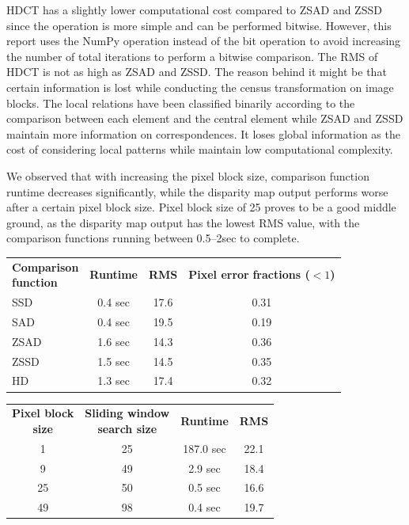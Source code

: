 \documentclass[conference]{IEEEtran}
\begin{document}
HDCT has a slightly lower computational cost compared to ZSAD and ZSSD since the operation is more simple and can be performed bitwise. However, this report uses the NumPy operation instead of the bit operation to avoid increasing the number of total iterations to perform a bitwise comparison. The RMS of HDCT is not as high as ZSAD and ZSSD. The reason behind it might be that certain information is lost while conducting the census transformation on image blocks. The local relations have been classified binarily according to the comparison between each element and the central element while ZSAD and ZSSD maintain more information on correspondences. It loses global information as the cost of considering local patterns while maintain low computational complexity.  

We observed that with increasing the pixel block size, comparison function runtime decreases significantly, while the disparity map output performs worse after a certain pixel block size. Pixel block size of 25 proves to be a good middle ground, as the disparity map output has the lowest RMS value, with the comparison functions running between 0.5--2sec to complete.

\begin{center}
    \begin{tabular}{l c c c}
        \pbox{4cm}{\textbf{Comparison} \\ \textbf{function}} & \textbf{Runtime} & \textbf{RMS} & \pbox{4cm}{\textbf{Pixel error} \\ \textbf{fractions ($<1$)}} \\ [2ex]
        SSD & 0.4 sec & 17.6 & 0.31 \\
        SAD & 0.4 sec & 19.5 & 0.19 \\
        ZSAD & 1.6 sec & 14.3 & 0.36 \\
        ZSSD & 1.5 sec & 14.5 & 0.35 \\
        HD & 1.3 sec & 17.4 & 0.32 
    \end{tabular}
\end{center}

\begin{center}
    \begin{tabular}{c c c c}
        \pbox{4cm}{\textbf{Pixel block} \\ \textbf{size}} & \pbox{4cm}{\textbf{Sliding window} \\ \textbf{search size}} & \textbf{Runtime} & \textbf{RMS} \\ [2ex]
        1 & 25 & 187.0 sec & 22.1 \\
        9 & 49 & 2.9 sec & 18.4 \\
        25 & 50 & 0.5 sec & 16.6 \\
        49 & 98 & 0.4 sec & 19.7
    \end{tabular}
\end{center}
\end{document}
